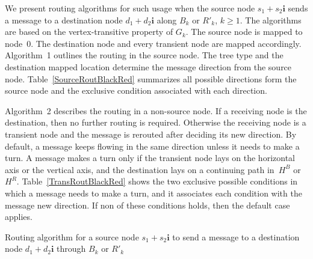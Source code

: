 \documentclass[12pt,journal,compsoc,onecolumn,]{IEEEtran}
\begin{document}
{We present routing algorithms for such usage when the source node
$s_{1}+s_{2}\mathbf{i}$ sends a message to a destination node $d_{1}+d_{2}\mathbf{i}$
along $B_{k}$ or $R'_{k}$, $k \ge 1$. The algorithms are based on the vertex-transitive property of $G_k$.
The source node is mapped to node~$0$. The destination node and every transient
node are mapped accordingly.
Algorithm~1 outlines the routing in the source node.
The tree type and the destination mapped location determine the message direction
from the source node.
Table~\ref{SourceRoutBlackRed} summarizes all possible directions form the source node and the exclusive condition
associated with each direction.

Algorithm~2 describes the routing in a non-source node. If a receiving node is the destination,
then no further routing is required.
Otherwise the receiving node is a transient node and the message is rerouted after deciding its new direction.
By default, a message keeps flowing in the same direction unless it needs to make a turn.
A message makes a turn only if the transient node lays on the horizontal axis or the vertical axis,
and the destination lays on a continuing path in~$H^B$ or~$H^R$.
Table~\ref{TransRoutBlackRed} shows the two exclusive possible conditions in which a message needs to make a turn,
and it associates each condition with the message new direction. If non of these conditions holds, then the default case
applies.

\begin{algorithm}[H]
\caption{Routing algorithm for a source node $s_{1}+s_{2}\mathbf{i}$ to send a message
to a destination node $d_{1}+d_{2}\mathbf{i}$ through $B_k$ or $R'_k$}
\end{algorithm}


}
\end{document}
